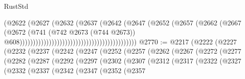 \begin{lexlean}{RustStd}
\begin{coremodule}
                                                                    (@2622
                                                                      (@2627
                                                                        (@2632
                                                                          (@2637
                                                                            (@2642
                                                                              (@2647
                                                                                (@2652
                                                                                  (@2657
                                                                                    (@2662
                                                                                      (@2667
                                                                                        (@2672
                                                                                          (@741
                                                                                            (@742
                                                                                              @2673
                                                                                              (@744
                                                                                                @2673))
                                                                                            @608))))))))))))))))))))))))))))))))))))))))))))
@2770 := @2217
    (@2222
      (@2227
        (@2232
          (@2237
            (@2242
              (@2247
                (@2252
                  (@2257
                    (@2262
                      (@2267
                        (@2272
                          (@2277
                            (@2282
                              (@2287
                                (@2292
                                  (@2297
                                    (@2302
                                      (@2307
                                        (@2312
                                          (@2317
                                            (@2322
                                              (@2327
                                                (@2332
                                                  (@2337
                                                    (@2342
                                                      (@2347
                                                        (@2352
                                                          (@2357

\end{coremodule}
\end{lexlean}
